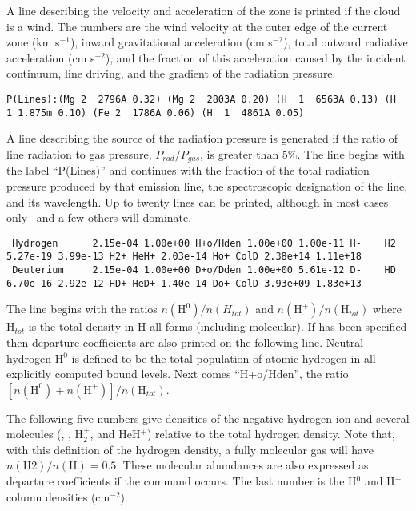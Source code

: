 A line describing the velocity and acceleration of the zone is printed
if the cloud is a wind.
The numbers are the wind velocity at the outer
edge of the current zone (km s$^{-1}$), inward gravitational acceleration (cm s$^{-2}$), total outward radiative acceleration (cm s$^{-2}$),
and the fraction of
this acceleration caused by the incident continuum, line driving, and the
gradient of the radiation pressure.
{\setverbatimfontsize{\tiny}
\begin{verbatim}
P(Lines):(Mg 2  2796A 0.32) (Mg 2  2803A 0.20) (H  1  6563A 0.13) (H  1 1.875m 0.10) (Fe 2  1786A 0.06) (H  1  4861A 0.05)
\end{verbatim}
}
A line describing the source of the radiation pressure is generated if
the ratio of line radiation to gas pressure, $P_{rad}/P_{gas}$,
is greater than 5\%.
The line begins with the label ``P(Lines)'' and
continues with the fraction
of the total radiation pressure produced by that emission line, the
spectroscopic designation of the line, and its wavelength.
Up to twenty
lines can be printed, although in most cases only \la\
and a few others will dominate.
{\setverbatimfontsize{\tiny}
\begin{verbatim}
 Hydrogen      2.15e-04 1.00e+00 H+o/Hden 1.00e+00 1.00e-11 H-    H2 5.27e-19 3.99e-13 H2+ HeH+ 2.03e-14 Ho+ ColD 2.38e+14 1.11e+18
 Deuterium     2.15e-04 1.00e+00 D+o/Dden 1.00e+00 5.61e-12 D-    HD 6.70e-16 2.92e-12 HD+ HeD+ 1.40e-14 Do+ ColD 3.93e+09 1.83e+13
\end{verbatim}
}

The line begins with the ratios $n(\mathrm{H}^0)/n(H_{tot})$ and
$n(\mathrm{H}^+)/n(\mathrm{H}_{tot})$ where
$\mathrm{H}_{tot}$ is the total density in H all forms (including molecular).
If \cdCommand{print h-like departure coefficients} has been specified
then departure coefficients
are also printed on the following line.
Neutral hydrogen H$^0$ is defined
to be the total population of atomic hydrogen in all explicitly computed
bound levels.
Next comes ``H+o/Hden'', the ratio
$[n(\mathrm{H}^0) + n(\mathrm{H}^+)]/n(\mathrm{H}_{tot})$.

The following five numbers give densities of the negative hydrogen ion
and several molecules (\hminus, \htwo, H$_2^+$, and HeH$^+$)
relative to the total hydrogen density.
Note that, with this definition of the hydrogen density, a fully
molecular gas will have $n(\mathrm{H}2)/n(\mathrm{H})=0.5$.
These molecular abundances are
also expressed as departure coefficients if the
command occurs.
The last number is the H$^0$ and H$^+$ column densities
(cm$^{-2}$).

